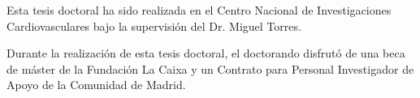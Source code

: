 
\setlength{\parindent}{0pt}

\vspace{100pt}

Esta tesis doctoral ha sido realizada en el Centro Nacional de Investigaciones Cardiovasculares bajo la supervisión del Dr. Miguel Torres. 

\vspace{20pt}

Durante la realización de esta tesis doctoral, el doctorando disfrutó de una beca de máster de la Fundación La Caixa y un Contrato para Personal Investigador de Apoyo de la Comunidad de Madrid.
\thispagestyle{cleared}
\setlength{\parindent}{1.5em}

